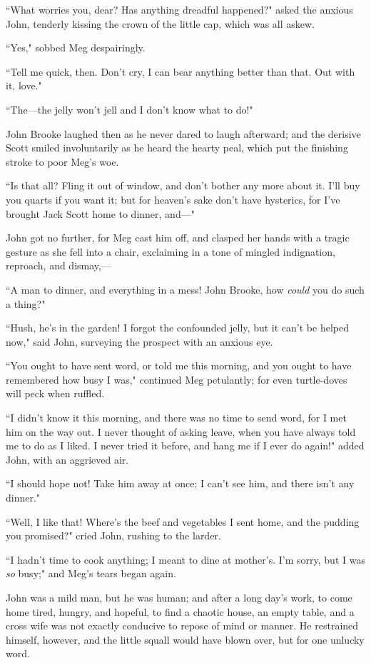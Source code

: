``What worries you, dear? Has anything dreadful happened?" asked the
anxious John, tenderly kissing the crown of the little cap, which was
all askew.

``Yes," sobbed Meg despairingly.

``Tell me quick, then. Don't cry, I can bear anything
better than that. Out with it, love."

``The---the jelly won't jell and I don't
know what to do!"

John Brooke laughed then as he never dared to laugh afterward; and the
derisive Scott smiled involuntarily as he heard the hearty peal, which
put the finishing stroke to poor Meg's woe.

``Is that all? Fling it out of window, and don't bother
any more about it. I'll buy you quarts if you want it;
but for heaven's sake don't have
hysterics, for I've brought Jack Scott home to dinner,
and---"

John got no further, for Meg cast him off, and clasped her hands with a
tragic gesture as she fell into a chair, exclaiming in a tone of mingled
indignation, reproach, and dismay,---

``A man to dinner, and everything in a mess! John Brooke, how
\emph{could} you do such a thing?"

``Hush, he's in the garden! I forgot the confounded
jelly, but it can't be helped now," said John, surveying
the prospect with an anxious eye.

``You ought to have sent word, or told me this morning, and you ought to
have remembered how busy I was," continued Meg petulantly; for even
turtle-doves will peck when ruffled.

``I didn't know it this morning, and there was no time to
send word, for I met him on the way out. I never thought of asking
leave, when you have always told me to do as I liked. I never tried it
before, and hang me if I ever do again!" added John, with an aggrieved
air.

``I should hope not! Take him away at once; I can't see
him, and there isn't any dinner."

``Well, I like that! Where's the beef and vegetables I
sent home, and the pudding you promised?" cried John, rushing to the
larder.

``I hadn't time to cook anything; I meant to dine at
mother's. I'm sorry, but I was \emph{so}
busy;" and Meg's tears began again.

John was a mild man, but he was human; and after a long
day's work, to come home tired, hungry, and hopeful, to
find a chaotic house, an empty table, and a cross wife was not exactly
conducive to repose of mind or manner. He restrained himself, however,
and the little squall would have blown over, but for one unlucky word.

